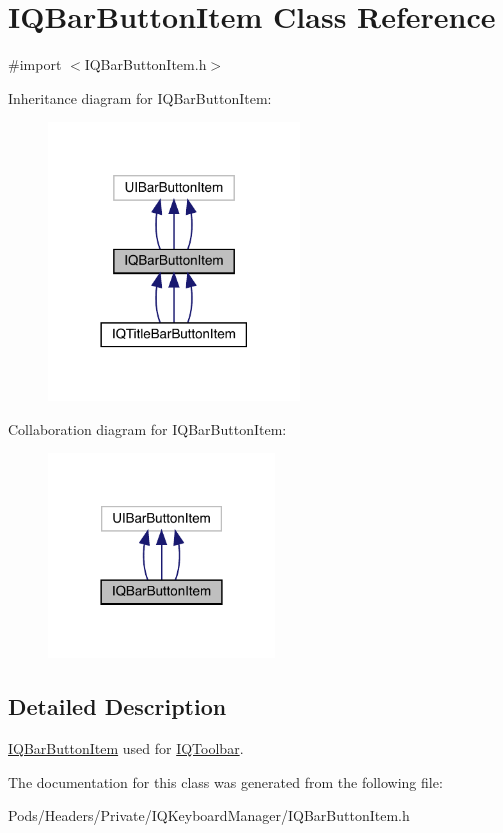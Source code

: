 \hypertarget{interface_i_q_bar_button_item}{}\section{I\+Q\+Bar\+Button\+Item Class Reference}
\label{interface_i_q_bar_button_item}


{\ttfamily \#import $<$I\+Q\+Bar\+Button\+Item.\+h$>$}



Inheritance diagram for I\+Q\+Bar\+Button\+Item\+:\nopagebreak
\begin{figure}[H]
\begin{center}
\leavevmode
\includegraphics[width=189pt]{interface_i_q_bar_button_item__inherit__graph}
\end{center}
\end{figure}


Collaboration diagram for I\+Q\+Bar\+Button\+Item\+:\nopagebreak
\begin{figure}[H]
\begin{center}
\leavevmode
\includegraphics[width=170pt]{interface_i_q_bar_button_item__coll__graph}
\end{center}
\end{figure}


\subsection{Detailed Description}
\mbox{\hyperlink{interface_i_q_bar_button_item}{I\+Q\+Bar\+Button\+Item}} used for \mbox{\hyperlink{interface_i_q_toolbar}{I\+Q\+Toolbar}}. 

The documentation for this class was generated from the following file\+:\begin{DoxyCompactItemize}
\item 
Pods/\+Headers/\+Private/\+I\+Q\+Keyboard\+Manager/I\+Q\+Bar\+Button\+Item.\+h\end{DoxyCompactItemize}

